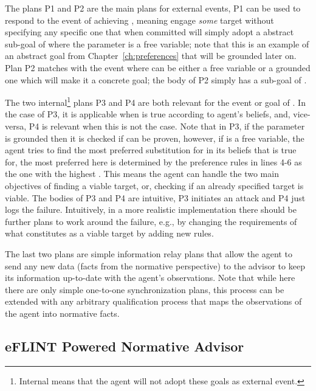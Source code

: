 The plans P1 and P2 are the main plans for external events, P1 can be used to respond to the event of achieving , meaning engage \textit{some} target without specifying any specific one that when committed will simply adopt a abstract sub-goal of  where the parameter  is a free variable; note that this is an example of an abstract goal from Chapter~\ref{ch:preferences} that will be grounded later on. Plan P2 matches with the event  where  can be either a free variable or a grounded one which will make it a concrete goal; the body of P2 simply has a sub-goal of .

The two internal\footnote{Internal means that the agent will not adopt these goals as external event.} plans P3 and P4 are both relevant for the event or goal of . In the case of P3, it is applicable when  is true according to agent's beliefs, and, vice-versa, P4 is relevant when this is not the case. Note that in P3, if the parameter  is grounded then it is checked if  can be proven, however, if  is a free variable, the agent tries to find the most preferred substitution for  in its beliefs that  is true for, the most preferred here is determined by the preference rules in lines 4-6 as the one with the highest . This means the agent can handle the two main objectives of finding a viable target, or, checking if an already specified target is viable. The bodies of P3 and P4 are intuitive, P3 initiates an attack and P4 just logs the failure. Intuitively, in a more realistic implementation there should be further plans to work around the failure, e.g., by changing the requirements of what constitutes as a viable target by adding new rules.%

The last two plans are simple information relay plans that allow the agent to send any new data (facts from the normative perspective) to the advisor to keep its information up-to-date with the agent's observations. Note that while here there are only simple one-to-one synchronization plans, this process can be extended with any arbitrary qualification process that maps the observations of the agent into normative facts. 




\subsection{eFLINT Powered Normative Advisor}

